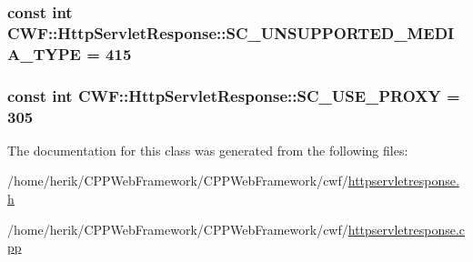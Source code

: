 \hypertarget{class_c_w_f_1_1_http_servlet_response_af01704b03a9a6d0c1eb7d4e55001517f}{
\subsubsection[{S\+C\+\_\+\+U\+N\+S\+U\+P\+P\+O\+R\+T\+E\+D\+\_\+\+M\+E\+D\+I\+A\+\_\+\+T\+Y\+P\+E}]{\setlength{\rightskip}{0pt plus 5cm}const int C\+W\+F\+::\+Http\+Servlet\+Response\+::\+S\+C\+\_\+\+U\+N\+S\+U\+P\+P\+O\+R\+T\+E\+D\+\_\+\+M\+E\+D\+I\+A\+\_\+\+T\+Y\+P\+E = 415\hspace{0.3cm}{\ttfamily [static]}}}\label{class_c_w_f_1_1_http_servlet_response_af01704b03a9a6d0c1eb7d4e55001517f}
\hypertarget{class_c_w_f_1_1_http_servlet_response_a30c0b9a751b9800a7258728630d59b63}{
\subsubsection[{S\+C\+\_\+\+U\+S\+E\+\_\+\+P\+R\+O\+X\+Y}]{\setlength{\rightskip}{0pt plus 5cm}const int C\+W\+F\+::\+Http\+Servlet\+Response\+::\+S\+C\+\_\+\+U\+S\+E\+\_\+\+P\+R\+O\+X\+Y = 305\hspace{0.3cm}{\ttfamily [static]}}}\label{class_c_w_f_1_1_http_servlet_response_a30c0b9a751b9800a7258728630d59b63}


The documentation for this class was generated from the following files\+:\begin{DoxyCompactItemize}
\item 
/home/herik/\+C\+P\+P\+Web\+Framework/\+C\+P\+P\+Web\+Framework/cwf/\hyperlink{httpservletresponse_8h}{httpservletresponse.\+h}\item 
/home/herik/\+C\+P\+P\+Web\+Framework/\+C\+P\+P\+Web\+Framework/cwf/\hyperlink{httpservletresponse_8cpp}{httpservletresponse.\+cpp}\end{DoxyCompactItemize}
